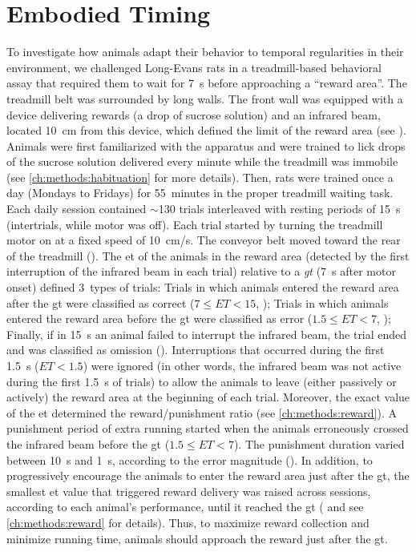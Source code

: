 \chapter{Embodied Timing} \label{ch:time}

To investigate how animals adapt their behavior to temporal regularities in their environment, we challenged Long-Evans rats in a treadmill-based behavioral assay that required them to wait for 7~s before approaching a ``reward area''.\footnotemark
{}
The treadmill belt was surrounded by long walls.
The front wall was equipped with a device delivering rewards (a drop of sucrose solution) and an infrared beam, located 10~cm from this device, which defined the limit of the reward area (see ).
Animals were first familiarized with the apparatus and were trained to lick drops of the sucrose solution delivered every minute while the treadmill was immobile (see \autoref{ch:methods:habituation} for more details).
Then, rats were trained once a day (Mondays to Fridays) for 55~minutes in the proper treadmill waiting task.
Each daily session contained $\sim$130 trials interleaved with resting periods of 15~s (intertrials, while motor was off).
Each trial started by turning the treadmill motor on at a fixed speed of 10~cm/s.
The conveyor belt moved toward the rear of the treadmill ().
The \gls{et} of the animals in the reward area (detected by the first interruption of the infrared beam in each trial) relative to a \emph{\gls{gt}} (7~s after motor onset) defined 3~types of trials:
    Trials in which animals entered the reward area after the \gls{gt} were classified as correct ($7\leq ET<15$, );
    Trials in which animals entered the reward area before the \gls{gt} were classified as error ($1.5\leq ET<7$, );
    Finally, if in 15~s an animal failed to interrupt the infrared beam, the trial ended and was classified as omission ().
Interruptions that occurred during the first 1.5~s ($ET<1.5$) were ignored (in other words, the infrared beam was not active during the first 1.5~s of trials) to allow the animals to leave (either passively or actively) the reward area at the beginning of each trial.
Moreover, the exact value of the \gls{et} determined the reward/punishment ratio (see \autoref{ch:methods:reward}).
A punishment period of extra running started when the animals erroneously crossed the infrared beam before the \gls{gt} ($1.5\leq ET<7$).
The punishment duration varied between 10~s and 1~s, according to the error magnitude ().
In addition, to progressively encourage the animals to enter the reward area just after the \gls{gt}, the smallest \gls{et} value that triggered reward delivery was raised across sessions, according to each animal's performance, until it reached the \gls{gt} ( and see \autoref{ch:methods:reward} for details).
Thus, to maximize reward collection and minimize running time, animals should approach the reward just after the \gls{gt}.

